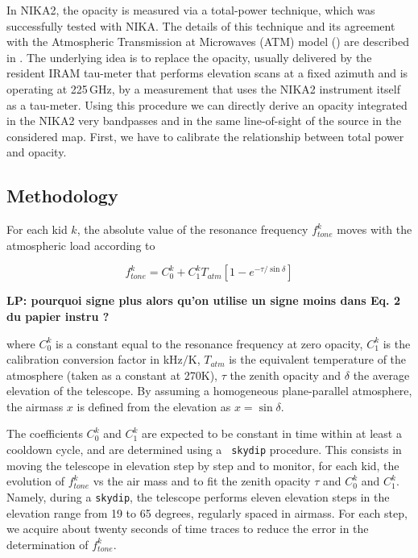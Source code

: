 
In NIKA2, the opacity is measured via a total-power technique, which was successfully tested with NIKA. The details of this technique and its agreement with the Atmospheric Transmission at Microwaves (ATM) model (\cite{2001IEEE....49.1683C}) are described in \cite{Catalano2014}. The underlying idea is to replace the opacity, usually delivered by the resident IRAM tau-meter that performs elevation scans at a fixed azimuth and is operating at 225\,GHz, by a measurement that uses the NIKA2 instrument itself as a tau-meter. Using this procedure we can directly derive an opacity integrated in the NIKA2 very bandpasses and in the same line-of-sight of the source in the considered map. First, we have to calibrate the relationship between total power and opacity.

\subsection{Methodology}
For each kid $k$, the absolute value of the resonance frequency
$f_{tone}^k$ moves with the atmospheric load according to

\begin{equation}
f_{tone}^k = C_0^k + C_1^k T_{atm}[1-e^{-\tau/\sin\delta}]
\end{equation}

{\bf LP: pourquoi signe plus alors qu'on utilise un signe moins dans
  Eq. 2 du papier instru ?}

where $C_0^k$ is a constant equal to the resonance
frequency at zero opacity, $C_1^k$ is the calibration conversion
factor in kHz$/$K, $T_{atm}$ is the equivalent temperature
of the atmosphere (taken as a constant at 270K), $\tau$ the zenith
opacity and $\delta$ the average elevation of the telescope.
By assuming a homogeneous plane-parallel atmosphere, the airmass $x$ is defined from the
elevation as $x = \sin\delta$. 

The coefficients $C_0^k$ and $C_1^k$ are expected to be constant in time
within at least a cooldown cycle, and are determined using a {\tt
  skydip} procedure. This consists in moving
the telescope in elevation step by step and to monitor, for each kid, the
evolution of $f_{tone}^k$ vs the air mass and to fit the zenith opacity $\tau$ and
$C_0^k$ and $C_1^k$. Namely, during a {\tt skydip}, the telescope performs
eleven elevation steps in the elevation range from 19 to 65 degrees, regularly
spaced in airmass. For each step, we acquire about twenty seconds of
time traces to reduce the error in the determination of $f_{tone}^k$.

